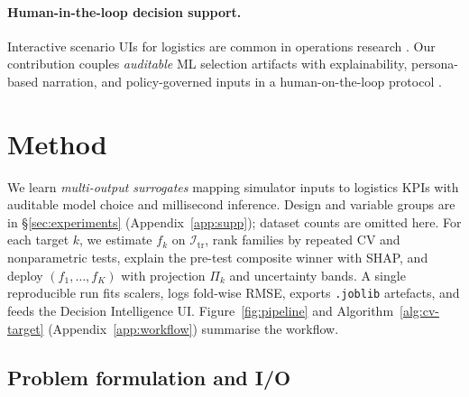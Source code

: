 \documentclass[10pt,twocolumn]{article}
\newcommand{\train}{\mathcal{I}_{\mathrm{tr}}}
\begin{document}
\paragraph{Human-in-the-loop decision support.}
Interactive scenario UIs for logistics are common in operations research \citep{byrne2009}.
Our contribution couples \emph{auditable} ML selection artifacts with explainability, persona-based narration, and policy-governed inputs in a human-on-the-loop protocol \citep{monarch2021,jiang2024,laato2022,bello2025}.

\section{Method}
\label{sec:method}

We learn \emph{multi-output surrogates} mapping simulator inputs to logistics KPIs with auditable model choice and millisecond inference.
Design and variable groups are in \S\ref{sec:experiments} (Appendix~\ref{app:supp}); dataset counts are omitted here.
For each target $k$, we estimate $f_k$ on $\train$, rank families by repeated CV and nonparametric tests, explain the pre-test composite winner with SHAP, and deploy $(f_1,\ldots,f_K)$ with projection $\Pi_k$ and uncertainty bands.
A single reproducible run fits scalers, logs fold-wise RMSE, exports \texttt{.joblib} artefacts, and feeds the Decision Intelligence UI.
Figure~\ref{fig:pipeline} and Algorithm~\ref{alg:cv-target} (Appendix~\ref{app:workflow}) summarise the workflow.

\subsection{Problem formulation and I/O}
\label{sec:method-io}
\end{document}
